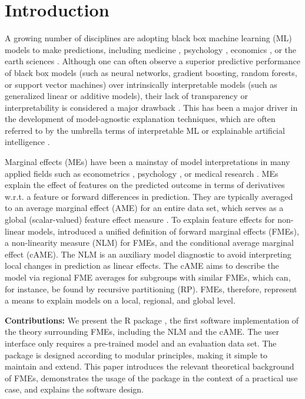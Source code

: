 \section{Introduction}

A growing number of disciplines are adopting black box machine learning (ML) models to make predictions, including medicine \citep{rajkomar_ml_medicine, boulesteix_ml_medicine}, psychology \citep{dwyer_psychology_ml}, economics \citep{mullainathan_econometrics_ml, athey_economics_ml}, or the earth sciences \citep{dueben_climate_ml}. Although one can often observe a superior predictive performance of black box models (such as neural networks, gradient boosting, random forests, or support vector machines) over intrinsically interpretable models (such as generalized linear or additive models), their lack of transparency or interpretability is considered a major drawback \citep{breiman_two_cultures}. This has been a major driver in the development of model-agnostic explanation techniques, which are often referred to by the umbrella terms of interpretable ML \citep{molnar_iml} or explainable artificial intelligence \citep{kamath_xai_book}.
\par
Marginal effects (MEs) \citep{williams_margins} have been a mainstay of model interpretations in many applied fields such as econometrics \citep{greene_econometric_analysis}, psychology \citep{mccabe_me_psychology}, or medical research \citep{onukwugha_me_primer}. MEs explain the effect of features on the predicted outcome in terms of derivatives w.r.t. a feature or forward differences in prediction. They are typically averaged to an average marginal effect (AME) for an entire data set, which serves as a global (scalar-valued) feature effect measure \citep{bartus_marginal_effects}. 
To explain feature effects for non-linear models, \citet{scholbeck_fme} introduced a unified definition of forward marginal effects (FMEs), a non-linearity measure (NLM) for FMEs, and the conditional average marginal effect (cAME).
The NLM is an auxiliary model diagnostic to avoid interpreting local changes in prediction as linear effects. The cAME aims to describe the model via regional FME averages for subgroups with similar FMEs, which can, for instance, be found by recursive partitioning (RP). FMEs, therefore, represent a means to explain models on a local, regional, and global level.
\par
\textbf{Contributions:} We present the R package , the first software implementation of the theory surrounding FMEs, including the NLM and the cAME. The user interface only requires a pre-trained model and an evaluation data set. The package is designed according to modular principles, making it simple to maintain and extend. This paper introduces the relevant theoretical background of FMEs, demonstrates the usage of the package in the context of a practical use case, and explains the software design.


